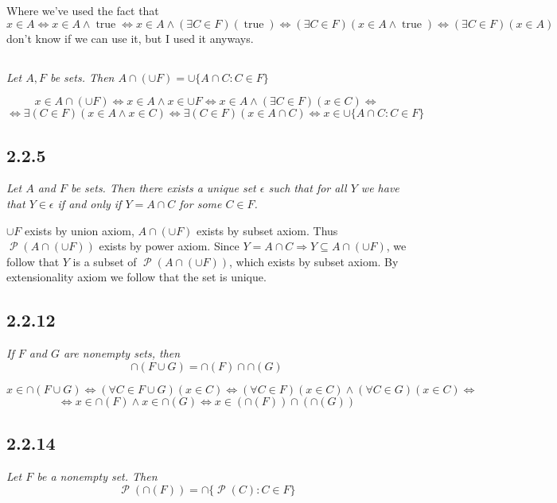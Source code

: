 \documentclass[11pt,oneside,titlepage]{book}
\DeclareMathOperator \pow {\mathcal {P}}
\DeclareMathOperator \lra {\Leftrightarrow}
\DeclareMathOperator \imp {\Rightarrow}
\DeclareMathOperator \true {true}
\begin{document}
Where we've used the fact that
$$x \in A \lra x \in A \land \true \lra x \in A \land (\exists C \in F)(\true) \lra
(\exists C \in F)(x \in A  \land \true) \lra  (\exists C \in F)(x \in A)$$
don't know if we can use it, but I used it anyways.




\subsection{}

\textit{Let $A, F$ be sets. Then $A \cap (\cup F) = \cup\{A \cap C: C \in F\}$}

$$x \in A \cap (\cup F) \lra x \in A \land x \in \cup F \lra
x \in A \land  (\exists C \in F)(x \in C) \lra$$
$$ \lra 
\exists(C \in F)(x \in A \land x \in C) \lra
\exists(C \in F)(x \in A \cap C) \lra x \in \cup\{A \cap C: C \in F\}$$


\subsection*{2.2.5}

\textit{Let $A$ and $F$ be sets. Then there exists a unique set $\epsilon$ such that for all
  $Y$ we have that $Y \in \epsilon$ if and only if $Y = A \cap C$ for some $C \in F$.}

$\cup F$ exists by union axiom, $A \cap (\cup F)$ exists by subset axiom. Thus $\pow(A \cap (\cup F))$
exists by power axiom. Since $Y = A \cap C \imp Y \subseteq A \cap (\cup F)$, we follow that
$Y$ is a subset of $\pow(A \cap (\cup F))$, which exists by subset axiom. By extensionality axiom we follow that
the set is unique.

\subsection*{2.2.12}

\textit{If $F$ and $G$ are nonempty sets, then }
$$\cap(F \cup G) = \cap(F) \cap  \cap(G)$$

$$x \in \cap(F \cup G) \lra (\forall C \in F \cup G)(x \in C) \lra (\forall C \in F)(x \in C) \land
(\forall C \in G)(x \in C) \lra $$
$$ \lra x \in \cap(F) \land x \in \cap(G) \lra x \in (\cap(F)) \cap (\cap(G))$$


\subsection*{2.2.14}

\textit{Let $F$ be a nonempty set. Then}
$$\pow(\cap (F)) = \cap\{\pow(C): C \in F\}$$
\end{document}
